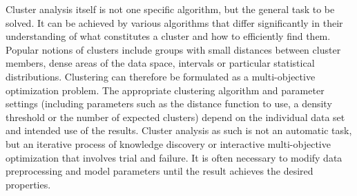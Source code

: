 \documentclass[12pt]{report}	%
\begin{document}
Cluster analysis itself is not one specific algorithm, but the general task to be solved. It can be achieved by various algorithms that differ significantly in their understanding of what constitutes a cluster and how to efficiently find them. Popular notions of clusters include groups with small distances between cluster members, dense areas of the data space, intervals or particular statistical distributions. Clustering can therefore be formulated as a multi-objective optimization problem. The appropriate clustering algorithm and parameter settings (including parameters such as the distance function to use, a density threshold or the number of expected clusters) depend on the individual data set and intended use of the results. Cluster analysis as such is not an automatic task, but an iterative process of knowledge discovery or interactive multi-objective optimization that involves trial and failure. It is often necessary to modify data preprocessing and model parameters until the result achieves the desired properties.
\end{document}
